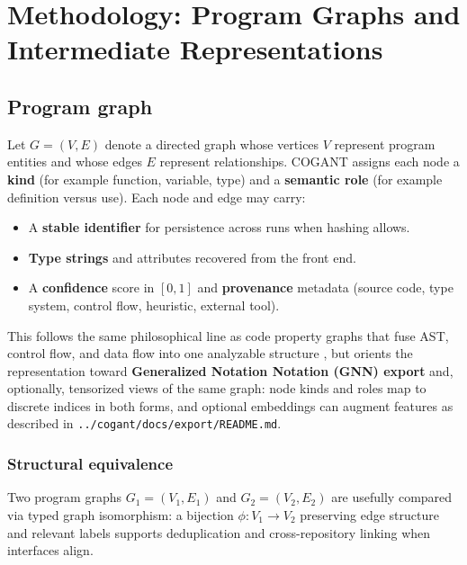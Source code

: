 \documentclass[
]{article}
\providecommand{\tightlist}{%
  \setlength{\itemsep}{0pt}\setlength{\parskip}{0pt}}
\begin{document}
\section{Methodology: Program Graphs and Intermediate
Representations}\label{methodology-program-graphs-and-intermediate-representations}

\subsection{Program graph}\label{program-graph}

Let \(G = (V, E)\) denote a directed graph whose vertices \(V\)
represent program entities and whose edges \(E\) represent
relationships. COGANT assigns each node a \textbf{kind} (for example
function, variable, type) and a \textbf{semantic role} (for example
definition versus use). Each node and edge may carry:

\begin{itemize}
\tightlist
\item
  A \textbf{stable identifier} for persistence across runs when hashing
  allows.
\item
  \textbf{Type strings} and attributes recovered from the front end.
\item
  A \textbf{confidence} score in \([0,1]\) and \textbf{provenance}
  metadata (source code, type system, control flow, heuristic, external
  tool).
\end{itemize}

This follows the same philosophical line as code property graphs that
fuse AST, control flow, and data flow into one analyzable structure
\citep{yamaguchi2014modeling}, but orients the representation toward
\textbf{Generalized Notation Notation (GNN) export} and, optionally,
tensorized views of the same graph: node kinds and roles map to discrete
indices in both forms, and optional embeddings can augment features as
described in \texttt{../cogant/docs/export/README.md}.

\subsubsection{Structural equivalence}\label{structural-equivalence}

Two program graphs \(G_1 = (V_1, E_1)\) and \(G_2 = (V_2, E_2)\) are
usefully compared via typed graph isomorphism: a bijection
\(\phi : V_1 \to V_2\) preserving edge structure and relevant labels
supports deduplication and cross-repository linking when interfaces
align.
\end{document}
